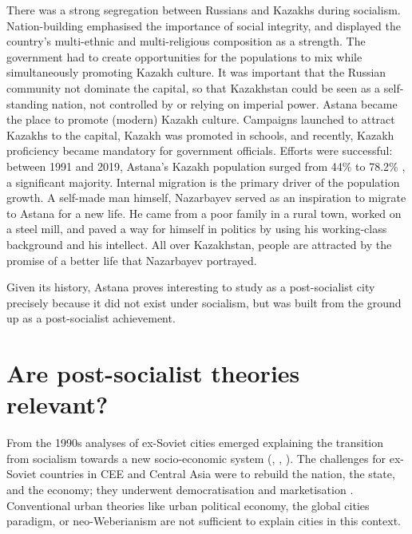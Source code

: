 \documentclass{article}
\begin{document}
There was a strong segregation between Russians and Kazakhs during socialism. Nation-building emphasised the importance of social integrity, and displayed the country's multi-ethnic and multi-religious composition as a strength. The government had to create opportunities for the populations to mix while simultaneously promoting Kazakh culture. It was important that the Russian community not dominate the capital, so that Kazakhstan could be seen as a self-standing nation, not controlled by or relying on imperial power. 
Astana became the place to promote (modern) Kazakh culture.
Campaigns launched to attract Kazakhs to the capital, Kazakh was promoted in schools, and recently, Kazakh proficiency became mandatory for government officials. Efforts were successful: between 1991 and 2019, Astana's Kazakh population surged from 44\% to 78.2\% \parencite{unfpa2020wekazakhstan}, a significant majority. 
Internal migration is the primary driver of the population growth. A self-made man himself, Nazarbayev served as an inspiration to migrate to Astana for a new life. He came from a poor family in a rural town, worked on a steel mill, and paved a way for himself in politics by using his working-class background and his intellect. All over Kazakhstan, people are attracted by the promise of a better life that Nazarbayev portrayed.

Given its history, Astana proves interesting to study as a post-socialist city precisely because it did not exist under socialism, but was built from the ground up as a post-socialist achievement.

\section{Are post-socialist theories relevant?}

From the 1990s analyses of ex-Soviet cities emerged explaining the transition from socialism towards a new socio-economic system (\cite{smith1996socialist}, \cite{sailer1999characteristics}, \cite{hirt2013whatever}). The challenges for ex-Soviet countries in CEE and Central Asia were to rebuild the nation, the state, and the economy; they underwent democratisation and marketisation \parencite{ferenvcuhova2016introduction}. 
Conventional urban theories like urban political economy, the global cities paradigm, or neo-Weberianism \parencite{haussermann2005european} are not sufficient to explain cities in this context.
\end{document}
